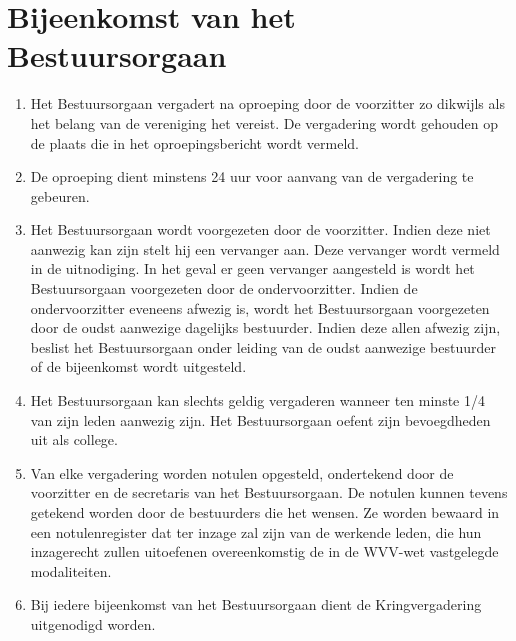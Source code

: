 \section{Bijeenkomst van het Bestuursorgaan}
    \begin{enumerate}
    \item Het Bestuursorgaan vergadert na oproeping door de voorzitter zo dikwijls als het belang van de vereniging het vereist. De vergadering wordt gehouden op de plaats die in het oproepingsbericht wordt vermeld.
    \item De oproeping dient minstens 24 uur voor aanvang van de vergadering te gebeuren.
    \item Het Bestuursorgaan wordt voorgezeten door de voorzitter. Indien deze niet aanwezig kan zijn stelt hij een vervanger aan. Deze vervanger wordt vermeld in de uitnodiging. In het geval er geen vervanger aangesteld is wordt het Bestuursorgaan voorgezeten door de ondervoorzitter. Indien de ondervoorzitter eveneens afwezig is, wordt het Bestuursorgaan voorgezeten door de oudst aanwezige dagelijks bestuurder. Indien deze allen afwezig zijn, beslist het Bestuursorgaan onder leiding van de oudst aanwezige bestuurder of de bijeenkomst wordt uitgesteld.
    \item Het Bestuursorgaan kan slechts geldig vergaderen wanneer ten minste 1/4 van zijn leden aanwezig zijn. Het Bestuursorgaan oefent zijn bevoegdheden uit als college.
    \item Van elke vergadering worden notulen opgesteld, ondertekend door de voorzitter en de secretaris van het Bestuursorgaan. De notulen kunnen tevens getekend worden door de bestuurders die het wensen. Ze worden bewaard in een notulenregister dat ter inzage zal zijn van de werkende leden, die hun inzagerecht zullen uitoefenen overeenkomstig de in de WVV-wet vastgelegde modaliteiten.
    \item Bij iedere bijeenkomst van het Bestuursorgaan dient de Kringvergadering uitgenodigd worden.
    \end{enumerate}

